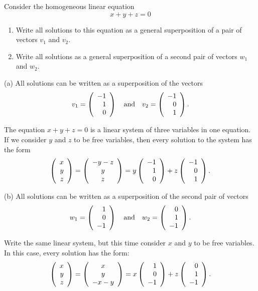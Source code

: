 \documentclass{ximera}
\begin{document}
\begin{exercise} \label{c4.4.1}
Consider the homogeneous linear equation
\[
x+y+z = 0
\]
\begin{enumerate}
\item[(a)]  Write all solutions to this equation as a general
superposition of a pair of vectors $v_1$ and $v_2$.
\item[(b)]  Write all solutions as a general superposition of
a second pair of vectors $w_1$ and $w_2$.
\end{enumerate}

\begin{solution}

(a) \ans All solutions can be written as a superposition of the vectors
\[
v_1 = \left(\begin{array}{r} -1 \\ 1 \\ 0\end{array}\right) \quad\mbox{and}\quad v_2 = \left(\begin{array}{r} -1 \\ 0 \\ 1\end{array}\right).
\]

\soln The equation $x + y + z = 0$ is a linear system of three variables
in one equation.  If we consider $y$ and $z$ to be free variables, then
every solution to the system has the form
\[
\left(\begin{array}{r} x \\ y \\ z\end{array}\right) = \left(\begin{array}{c} -y - z \\ y \\
z \end{array}\right) = y\left(\begin{array}{r} -1 \\ 1 \\ 0\end{array}\right) +
z\left(\begin{array}{r} -1 \\ 0 \\ 1\end{array}\right).
\]

(b) \ans All solutions can be written as a superposition
of the second pair of vectors
\[
w_1 = \left(\begin{array}{r} 1 \\ 0 \\ -1\end{array}\right) \quad\mbox{and}\quad w_2 = \left(\begin{array}{r} 0 \\ 1 \\ -1\end{array}\right).
\]

\soln Write the same linear system, but this time consider $x$ and $y$
to be free variables.  In this case, every solution has the form:
\[
\left(\begin{array}{r} x \\ y \\ z\end{array}\right) = \left(\begin{array}{c} x \\ y \\
-x - y \end{array}\right) = x\left(\begin{array}{r} 1 \\ 0 \\ -1\end{array}\right) +
z\left(\begin{array}{r} 0 \\ 1 \\ -1\end{array}\right).
\]

\end{solution}
\end{exercise}
\end{document}
